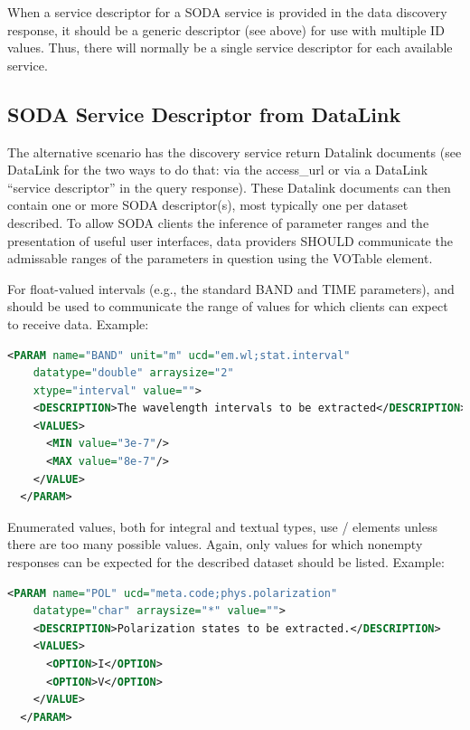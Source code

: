 \documentclass[11pt,a4paper]{ivoa}
\begin{document}
When a service descriptor for a SODA service is provided in the data
discovery response, it should be a generic descriptor (see above) for
use with multiple ID values. Thus, there will normally be a single
service descriptor for each available service.


\subsection{SODA Service Descriptor from DataLink}
\label{sec:disc-links-soda}

The alternative scenario has the discovery service return Datalink
documents (see DataLink for the two ways to do that:  via the
access\_url or via a DataLink ``service descriptor'' in 
the query response).  These
Datalink documents can then contain one or more SODA descriptor(s),
most typically one per dataset described.  To allow SODA clients
the inference of parameter ranges and the presentation of useful
user interfaces, data providers SHOULD communicate the admissable
ranges of the parameters in question using the VOTable
 element.

For float-valued intervals (e.g., the standard BAND and TIME
parameters),  and  should be used to
communicate the range of values for which clients can expect to
receive data.  Example:

\begin{lstlisting}[language=XML]
  <PARAM name="BAND" unit="m" ucd="em.wl;stat.interval"
    datatype="double" arraysize="2"      
    xtype="interval" value="">     
    <DESCRIPTION>The wavelength intervals to be extracted</DESCRIPTION>
    <VALUES>                                                           
      <MIN value="3e-7"/>
      <MAX value="8e-7"/>
    </VALUE>             
  </PARAM>  
\end{lstlisting}

Enumerated values, both for integral and textual types, use
/ elements unless there are too many possible
values.  Again, only values for which nonempty responses can be
expected for the described dataset should be listed.  Example:

\begin{lstlisting}[language=XML]
  <PARAM name="POL" ucd="meta.code;phys.polarization"
    datatype="char" arraysize="*" value="">          
    <DESCRIPTION>Polarization states to be extracted.</DESCRIPTION>
    <VALUES>
      <OPTION>I</OPTION>
      <OPTION>V</OPTION>
    </VALUE>
  </PARAM>
\end{lstlisting}
\end{document}
